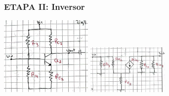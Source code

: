 \documentclass[conference]{IEEEtran}
\begin{document}
\subsubsection{ETAPA II: Inversor}


\includegraphics[width=4.5cm]{imagenes/etapa2.PNG}
\includegraphics[width=4cm]{imagenes/etapa2.1.PNG}
\end{document}
